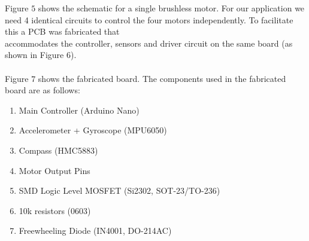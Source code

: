 \documentclass[9pt]{article}
\begin{document}
\noindent Figure $5$ shows the schematic for a single brushless motor. For our application we need 4 identical circuits to control the four motors independently. To facilitate this a PCB was fabricated that\\ accommodates the controller, sensors and driver circuit on the same board (as shown in Figure $6$).\\ \\
Figure $7$ shows the fabricated board. The components used in the fabricated board are as follows:

\begin{enumerate}
\item Main Controller (Arduino Nano)
\item Accelerometer + Gyroscope (MPU6050)
\item Compass (HMC5883)
\item Motor Output Pins
\item SMD Logic Level MOSFET (Si2302, SOT-23/TO-236)
\item 10k resistors (0603)
\item Freewheeling Diode (IN4001, DO-214AC) \\
\end{enumerate}
 
\end{document}
